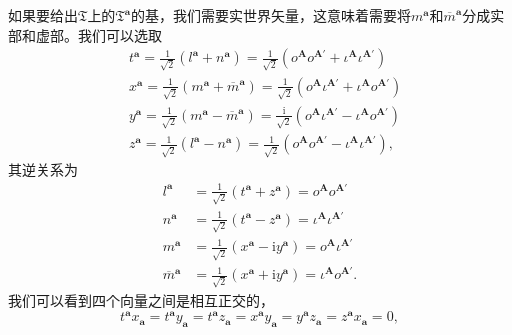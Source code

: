 如果要给出$\mathfrak{T}$上的$\mathfrak{T}^{\boldsymbol{a}}$的基，我们需要实世界矢量，这意味着需要将$m^{\boldsymbol{a}}$和$\overline{m}^{\boldsymbol{a}}$分成实部和虚部。我们可以选取
\begin{equation}
	\begin{aligned}
		& t^{\boldsymbol{a}} =\frac{1}{\sqrt{2}} (l^{\boldsymbol{a}} +n^{\boldsymbol{a}} )=\frac{1}{\sqrt{2}} (o^{\boldsymbol{A}} o^{\boldsymbol{A} '} +\iota ^{\boldsymbol{A}} \iota ^{\boldsymbol{A} '} )\\
		& x^{\boldsymbol{a}} =\frac{1}{\sqrt{2}} (m^{\boldsymbol{a}} +\overline{m}^{\boldsymbol{a}} )=\frac{1}{\sqrt{2}} (o^{\boldsymbol{A}} \iota ^{\boldsymbol{A} '} +\iota ^{\boldsymbol{A}} o^{\boldsymbol{A} '} )\\
		& y^{\boldsymbol{a}} =\frac{1}{\sqrt{2}} (m^{\boldsymbol{a}} -\overline{m}^{\boldsymbol{a}} )=\frac{\mathrm{i}}{\sqrt{2}} (o^{\boldsymbol{A}} \iota ^{\boldsymbol{A} '} -\iota ^{\boldsymbol{A}} o^{\boldsymbol{A} '} )\\
		& z^{\boldsymbol{a}} =\frac{1}{\sqrt{2}} (l^{\boldsymbol{a}} -n^{\boldsymbol{a}} )=\frac{1}{\sqrt{2}} (o^{\boldsymbol{A}} o^{\boldsymbol{A} '} -\iota ^{\boldsymbol{A}} \iota ^{\boldsymbol{A} '} ),
	\end{aligned}
	\label{eq:4.2}
\end{equation}
其逆关系为
\begin{equation*}
	\begin{aligned}
		l^{\boldsymbol{a}} & =\frac{1}{\sqrt{2}} (t^{\boldsymbol{a}} +z^{\boldsymbol{a}} )=o^{\boldsymbol{A}} o^{\boldsymbol{A} '}\\
		n^{\boldsymbol{a}} & =\frac{1}{\sqrt{2}} (t^{\boldsymbol{a}} -z^{\boldsymbol{a}} )=\iota ^{\boldsymbol{A}} \iota ^{\boldsymbol{A} '}\\
		m^{\boldsymbol{a}} & =\frac{1}{\sqrt{2}} (x^{\boldsymbol{a}} -\mathrm{i} y^{\boldsymbol{a}} )=o^{\boldsymbol{A}} \iota ^{\boldsymbol{A} '}\\
		\overline{m}^{\boldsymbol{a}} & =\frac{1}{\sqrt{2}} (x^{\boldsymbol{a}} +\mathrm{i} y^{\boldsymbol{a}} )=\iota ^{\boldsymbol{A}} o^{\boldsymbol{A} '} .
	\end{aligned}
\end{equation*}
我们可以看到四个向量之间是相互正交的，
\begin{equation*}
	t^{\boldsymbol{a}} x_{\boldsymbol{a}} =t^{\boldsymbol{a}} y_{\boldsymbol{a}} =t^{\boldsymbol{a}} z_{\boldsymbol{a}} =x^{\boldsymbol{a}} y_{\boldsymbol{a}} =y^{\boldsymbol{a}} z_{\boldsymbol{a}} =z^{\boldsymbol{a}} x_{\boldsymbol{a}} =0,
\end{equation*}
